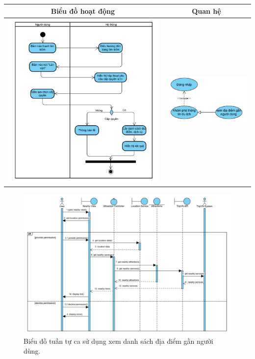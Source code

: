 \noindent 
\begin{tabular}{| c | c |}
    \hline
    \textbf{Biểu đồ hoạt động} & \textbf{Quan hệ} \\ 
    \hline
    \includegraphics[width=0.5\linewidth]{figures/c3/3-3-7-ad.png} 
    & 
    \includegraphics[width=0.45\linewidth]{figures/c3/3-3-7-rd.png} \\ 
    \hline
\end{tabular}


\vspace{0.8cm}

\begin{figure}[H]
    \centering  
    \includegraphics[width=1\textwidth]{figures/c3/3-3-7-sd.png}
    \caption{Biểu đồ tuần tự ca sử dụng xem danh sách địa điểm gần người dùng.}
    \label{fig:3-3-7-sequence-diagram}
\end{figure}